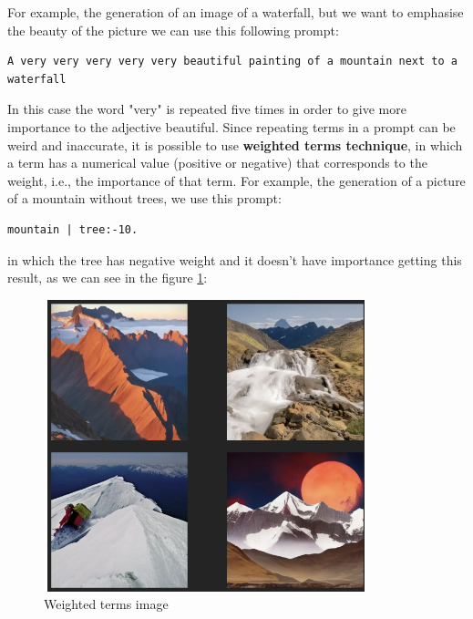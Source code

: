 For example, the generation of an image of a waterfall, but we want to emphasise the beauty of the picture we can use this following prompt:
\begin{lstlisting}
A very very very very very beautiful painting of a mountain next to a waterfall
\end{lstlisting}
In this case the word "very" is repeated five times in order to give more importance to the adjective beautiful.
Since repeating terms in a prompt can be weird and inaccurate, it is possible to use \textbf{weighted terms technique}\cite{weighted_terms}, in which a term has a numerical value (positive or negative) that corresponds to the weight, i.e., the importance of that term.
For example, the generation of a picture of a mountain without trees, we use this prompt:
\begin{lstlisting}
mountain | tree:-10.
\end{lstlisting}
in which the tree has negative weight and it doesn't have importance getting this result, as we can see in the figure \ref{fig:15}:
\begin{figure}[H]
    \centering
    \includegraphics[width=0.5\linewidth]{Figures/fig_15.png}
    \caption{Weighted terms image}
    \label{fig:15}
\end{figure}

